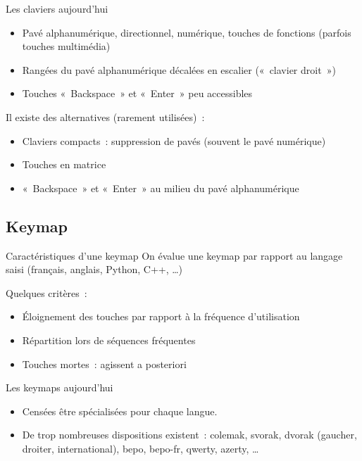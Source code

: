 \begin{frame}{Les claviers aujourd’hui}
  \begin{itemize}
    \item Pavé alphanumérique, directionnel, numérique, touches de fonctions
      (parfois touches multimédia) \pause

    \item Rangées du pavé alphanumérique décalées en escalier («~clavier
      droit~») \pause

    \item Touches «~Backspace~» et «~Enter~» peu accessibles
  \end{itemize} \pause

  Il existe des alternatives (rarement utilisées)~: \pause
  \begin{itemize}
    \item Claviers compacts~: suppression de pavés (souvent le pavé numérique)
      \pause

    \item Touches en matrice \pause

    \item «~Backspace~» et «~Enter~» au milieu du pavé alphanumérique
  \end{itemize}
\end{frame}



\subsection{Keymap}

\begin{frame}{Caractéristiques d’une keymap}
  On évalue une keymap par rapport au langage saisi (français, anglais, Python,
  C++, …) \pause

  Quelques critères~:
  \begin{itemize}
    \item Éloignement des touches par rapport à la fréquence d’utilisation
      \pause

    \item Répartition lors de séquences fréquentes \pause

    \item Touches mortes~: agissent a posteriori
  \end{itemize}
\end{frame}

\begin{frame}{Les keymaps aujourd’hui}
  \begin{itemize}
    \item Censées être spécialisées pour chaque langue. \pause

    \item De trop nombreuses dispositions existent~: colemak, svorak, dvorak
      (gaucher, droiter, international), bepo, bepo-fr, qwerty, azerty, …
  \end{itemize}
\end{frame}
